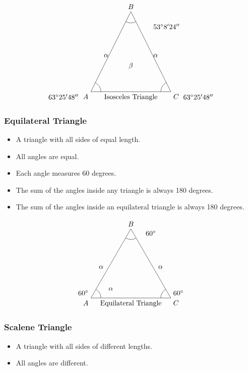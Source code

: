 \[ 
\begin{tikzpicture}
    \draw (0,0) -- (2,4) -- (4,0) -- cycle;
    \node[below] at (2,0) {Isosceles Triangle};
    \node[below left] at (0,0) {$A$};
    \node[above] at (2,4) {$B$};
    \node[below right] at (4,0) {$C$};
    \node[below left] at (1,2) {$\alpha$};
    \node[below right] at (3,2) {$\alpha$};
    \node[above] at (2,1) {$\beta$};
    \draw (.5,0) arc[start angle=0, end angle=63.43, radius=0.5];
    \draw (3.5,0) arc[start angle=180, end angle=116.57, radius=0.5];
    \draw (1.75,3.5) arc[start angle=240, end angle=300, radius=0.5];
    \node[above right] at (3,3) {\(53^\circ 8' 24''\)};
    \node[below left] at (-0.5,0) {\(63^\circ 25' 48''\)};
    \node[below right] at (4.5,0) {\(63^\circ 25' 48''\)};
\end{tikzpicture}
\]

\subsubsection{Equilateral Triangle}
\begin{itemize}
    \item A triangle with all sides of equal length.
    \item All angles are equal.
    \item Each angle measures 60 degrees.
    \item The sum of the angles inside any triangle is always 180 degrees.
    \item The sum of the angles inside an equilateral triangle is always 180 degrees.
\end{itemize}

\[
\begin{tikzpicture}
    \draw (0,0) -- (2,3.46) -- (4,0) -- cycle;
    \node[below] at (2,0) {Equilateral Triangle};
    \node[below left] at (0,0) {$A$};
    \node[above] at (2,3.46) {$B$};
    \node[below right] at (4,0) {$C$};
    \node[below left] at (.75,1.75) {$\alpha$};
    \node[below right] at (3.25,1.75) {$\alpha$};
    \node[above] at (,0.25) {$\alpha$};
    \node[below left] at (0,0.5) {$60^\circ$};
    \node[below right] at (4,0.5) {$60^\circ$};
    \node[above] at (3,3) {$60^\circ$};
    \draw (0.5,0) arc[start angle=0, end angle=60, radius=0.5];
    \draw (3.5,0) arc[start angle=180, end angle=120, radius=0.5];
    \draw (1.75,3) arc[start angle=240, end angle=300, radius=0.5];
\end{tikzpicture}
\]

\subsubsection{Scalene Triangle}
\begin{itemize}
    \item A triangle with all sides of different lengths.
    \item All angles are different.
\end{itemize}

